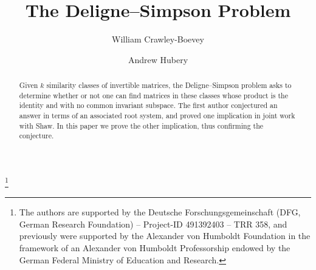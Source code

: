 \documentclass[12pt,a4paper]{amsart}
\theoremstyle{plain}
\begin{document}
\title{The Deligne--Simpson Problem}
\author{William Crawley-Boevey}
\author{Andrew Hubery}
\address{Fakult\"at f\"ur Mathematik, Universit\"at Bielefeld, 33501 Bielefeld, Germany}









\thanks{The authors are supported by the Deutsche Forschungsgemeinschaft (DFG, German Research Foundation) – Project-ID 491392403 – TRR 358, and previously were supported by the Alexander von Humboldt Foundation in the framework of an Alexander von Humboldt Professorship endowed by the German Federal Ministry of Education and Research.}


\begin{abstract}
Given $k$ similarity classes of invertible matrices, the Deligne--Simpson problem asks to determine whether or not one can find matrices in these classes whose product is the identity and with no common invariant subspace. The first author conjectured an answer in terms of an associated root system, and proved one implication in joint work with Shaw. In this paper we prove the other implication, thus confirming the conjecture.
\end{abstract}
\maketitle
\end{document}
